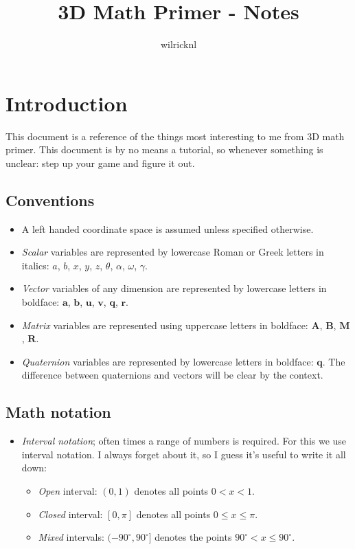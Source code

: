 \documentclass[a4paper,11pt]{article}
\author{wilricknl}
\title{3D Math Primer - Notes}
\begin{document}
\maketitle

\newpage
\tableofcontents

\newpage
\section{Introduction}

This document is a reference of the things most interesting to me from 3D math primer. This document is by no means a tutorial, so whenever something is unclear: step up your game and figure it out.

\subsection{Conventions}

\begin{itemize}
\item A left handed coordinate space is assumed unless specified otherwise.
\item \textit{Scalar} variables are represented by lowercase Roman or Greek letters in italics: $a$, $b$, $x$, $y$, $z$, $\theta$,
  $\alpha$, $\omega$, $\gamma$.
\item
  \textit{Vector} variables of any dimension are represented by lowercase
  letters in boldface: $\mathbf{a}$, $\mathbf{b}$, $\mathbf{u}$, $\mathbf{v}$, $\mathbf{q}$, $\mathbf{r}$.
\item \textit{Matrix} variables are represented using uppercase letters in
  boldface: $\mathbf{A}$, $\mathbf{B}$, $\mathbf{M}$, $\mathbf{R}$.
 \item \textit{Quaternion} variables are represented by lowercase letters in boldface: $\textbf{q}$. The difference between quaternions and vectors will be clear by the context.
\end{itemize}

\subsection{Math notation}

\begin{itemize}
	\item \textit{Interval notation}; often times a range of numbers is required. For this we use interval notation. I always forget about it, so I guess it's useful to write it all down:
	\begin{itemize}
		\item \textit{Open} interval: $(0,1)$ denotes all points $0 < x < 1$.
		\item \textit{Closed} interval: $[0,\pi]$ denotes all points $0 \leq x \leq \pi$.
		\item \textit{Mixed} intervals: $(-90^\circ, 90^\circ]$ denotes the points $90^\circ < x \leq 90^\circ$.
	\end{itemize}
\end{itemize}
\end{document}
